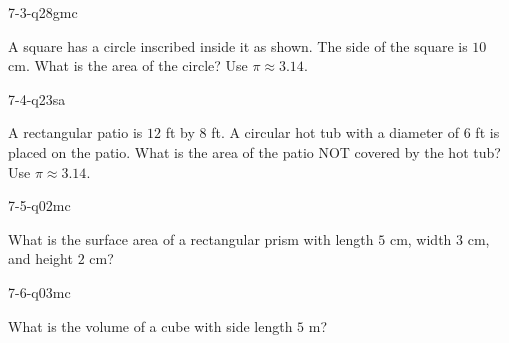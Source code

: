 \begin{practiceQuestion}{7-3-q28}{gmc}
\begin{questionText}
A square has a circle inscribed inside it as shown. The side of the square is $10$ cm. What is the area of the circle? Use $\pi \approx 3.14$.

\begin{center}
\end{center}
\end{questionText}
\end{practiceQuestion}

\begin{practiceQuestion}{7-4-q23}{sa}
\begin{questionText}
A rectangular patio is $12$ ft by $8$ ft. A circular hot tub with a diameter of $6$ ft is placed on the patio. What is the area of the patio NOT covered by the hot tub? Use $\pi \approx 3.14$.
\end{questionText}
\end{practiceQuestion}

\begin{practiceQuestion}{7-5-q02}{mc}
\begin{questionText}
What is the surface area of a rectangular prism with length $5$ cm, width $3$ cm, and height $2$ cm?
\end{questionText}
\end{practiceQuestion}

\begin{practiceQuestion}{7-6-q03}{mc}
\begin{questionText}
What is the volume of a cube with side length $5$ m?
\end{questionText}
\end{practiceQuestion}

